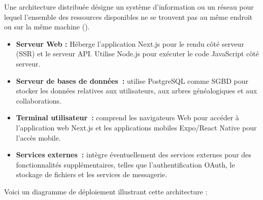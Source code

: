 Une architecture distribuée  désigne un système d'information ou un réseau pour
lequel l'ensemble des ressources disponibles ne se trouvent pas au même endroit
ou sur la même machine (\textcite{frwiki:212787328}).


\begin{itemize}
  \item \textbf{ Serveur Web :} Héberge l'application Next.js pour le rendu
    côté serveur (SSR) et le serveur API. Utilise Node.js pour exécuter le
    code JavaScript côté serveur.

  \item \textbf{Serveur de bases de données :} utilise PostgreSQL comme SGBD
    pour stocker les données relatives aux utilisateurs, aux arbres
    généalogiques et aux collaborations.

  \item \textbf{ Terminal utilisateur :} comprend les navigateurs Web pour
    accéder à l’application web Next.js et les applications mobiles Expo/React
    Native pour l’accès mobile.

  \item \textbf{Services externes :} intègre éventuellement des services
    externes pour des fonctionnalités supplémentaires, telles que
    l’authentification OAuth, le stockage de fichiers et les
    services de messagerie.

\end{itemize}

Voici un diagramme de déploiement illustrant cette architecture :

